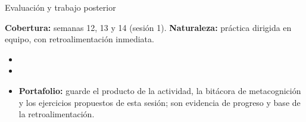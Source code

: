 \documentclass[10pt,aspectratio=169]{beamer}
\begin{document}
\begin{frame}{Evaluación y trabajo posterior}
  \small
  \begin{evalbox}
    \textbf{Cobertura:} semanas 12, 13 y 14 (sesión 1). \textbf{Naturaleza:} práctica dirigida en equipo, con retroalimentación inmediata.
  \end{evalbox}
  \begin{itemize}
    \item \criterios
    \item \declaracionia
    \item \textbf{Portafolio:} guarde el producto de la actividad, la bitácora de metacognición y los ejercicios propuestos de esta sesión; son evidencia de progreso y base de la retroalimentación.
  \end{itemize}
\end{frame}
\end{document}
